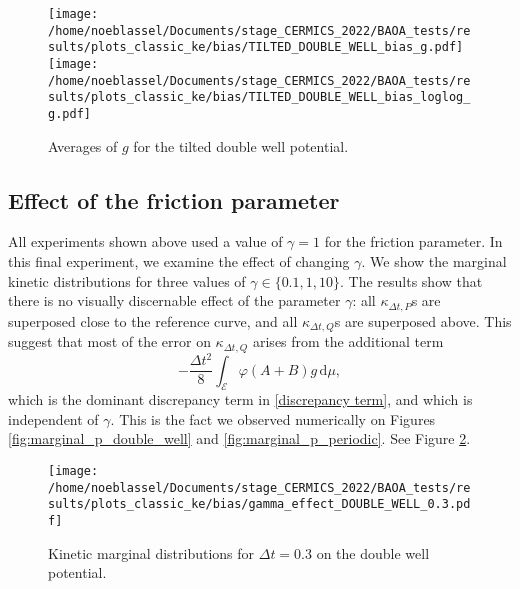 \begin{figure}[htbp]
  \begin{center}
    \texttt{[image: /home/noeblassel/Documents/stage\_CERMICS\_2022/BAOA\_tests/results/plots\_classic\_ke/bias/TILTED\_DOUBLE\_WELL\_bias\_g.pdf]}
    \texttt{[image: /home/noeblassel/Documents/stage\_CERMICS\_2022/BAOA\_tests/results/plots\_classic\_ke/bias/TILTED\_DOUBLE\_WELL\_bias\_loglog\_g.pdf]}
    \caption{ \label{fig:tilted_double_well_bias}
      Averages of $g$ for the tilted double well potential.
    }
  \end{center}
\end{figure}


\subsection{Effect of the friction parameter}\label{gamma does not count}
All experiments shown above used a value of $\gamma=1$ for the friction parameter. In this final experiment, we examine the effect of changing $\gamma$.
We show the marginal kinetic distributions for three values of $\gamma\in \{0.1,1,10\}$.
The results show that there is no visually discernable effect of the parameter $\gamma$: all $\kappa_{\Delta t,P}$s are superposed close to the reference curve, and all $\kappa_{\Delta t,Q}$s are superposed above. This suggest that most of the error on $\kappa_{\Delta t,Q}$ arises from the additional term
$$-\frac{\Delta t^2}8\int_{\mathcal E} \varphi (A+B)g\, \mathrm{d}\mu,$$
which is the dominant discrepancy term in \eqref{discrepancy term}, and which is independent of $\gamma$. This is the fact we observed numerically on Figures \ref{fig:marginal_p_double_well} and \ref{fig:marginal_p_periodic}.
See Figure \ref{fig:gamma_effect}.

\begin{figure}[htbp]
  \begin{center}
    \texttt{[image: /home/noeblassel/Documents/stage\_CERMICS\_2022/BAOA\_tests/results/plots\_classic\_ke/bias/gamma\_effect\_DOUBLE\_WELL\_0.3.pdf]}
    \caption{ \label{fig:gamma_effect}
      Kinetic marginal distributions for $\Delta t=0.3$ on the double well potential.
    }
  \end{center}
\end{figure}